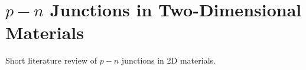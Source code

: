 \section{$p-n$ Junctions in Two-Dimensional Materials}\label{sec:sec002}
Short literature review of $p-n$ junctions in 2D materials.

